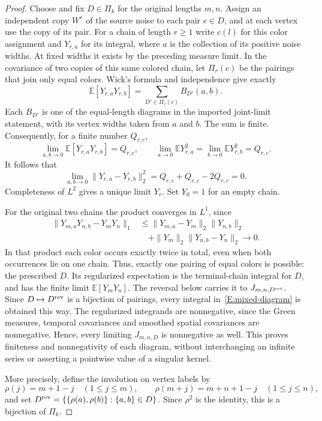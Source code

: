 \documentclass[12pt]{article}
\numberwithin{equation}{section}
\theoremstyle{definition}
\newcommand{\E}{\mathbb{E}}
\begin{document}
\begin{proof}
  Choose and fix $D\in\Pi_k$ for the original lengths $m,n$.
  Assign an independent copy $W^e$ of the source noise to each pair
  $e\in D$, and at each vertex use the copy of its pair. For a chain
  of length $r\ge1$ write $c(l)$ for this color assignment and
  $Y_{r,a}$ for its integral, where $a$ is the collection of its positive
  noise widths. At fixed widths it exists by the preceding measure limit.
  In the covariance of two copies of this same colored chain, let
  $\Pi_r(c)$ be the pairings that join only equal colors. Wick's formula
  and independence give exactly
  \[
    \E[Y_{r,a}Y_{r,b}]
    =\sum_{D'\in\Pi_r(c)}B_{D'}(a,b).
  \]
  Each $B_{D'}$ is one of the equal-length diagrams in the imported
  joint-limit statement, with its vertex widths taken from $a$ and $b$.
  The sum is finite. Consequently, for a finite number $Q_{r,c}$,
  \[
    \lim_{a,b\to0}\E[Y_{r,a}Y_{r,b}]=Q_{r,c},\qquad
    \lim_{a\to0}\E Y_{r,a}^2=\lim_{b\to0}\E Y_{r,b}^2=Q_{r,c}.
  \]
  It follows that
  \[
    \lim_{a,b\to0}\|Y_{r,a}-Y_{r,b}\|_2^2
    =Q_{r,c}+Q_{r,c}-2Q_{r,c}=0.
  \]
  Completeness of $L^2$ gives a unique limit $Y_r$. Set $Y_0=1$
  for an empty chain.

  For the original two chains the product converges in $L^1$, since
  \[
    \begin{split}
      \|Y_{m,a}Y_{n,b}-Y_mY_n\|_1
      &\le\|Y_{m,a}-Y_m\|_2\|Y_{n,b}\|_2\\
      &\quad+\|Y_m\|_2\|Y_{n,b}-Y_n\|_2\longrightarrow0.
    \end{split}
  \]
  In that product each color occurs exactly twice in total, even when
  both occurrences lie on one chain. Thus, exactly one pairing of equal
  colors is possible: the prescribed $D$. Its regularized expectation
  is the terminal-chain integral for $D$, and has the finite limit
  $\E[Y_mY_n]$. The reversal below carries it to $J_{m,n,D^{\rm rev}}$.
  Since $D\mapsto D^{\rm rev}$ is a bijection of pairings, every
  integral in~\eqref{E:mixed-diagram} is obtained this way.
  The regularized integrands are nonnegative, since the Green measures,
  temporal covariances and smoothed spatial covariances are nonnegative.
  Hence, every limiting $J_{m,n,D}$ is nonnegative as well. This proves
  finiteness and nonnegativity of each diagram, without interchanging
  an infinite series or asserting a pointwise value of a singular kernel.

  More precisely, define the involution on vertex labels by
  \[
    \rho(j)=m+1-j\quad(1\le j\le m),\qquad
    \rho(m+j)=m+n+1-j\quad(1\le j\le n),
  \]
  and set $D^{\rm rev}=\{\{\rho(a),\rho(b)\}:\{a,b\}\in D\}$.
  Since $\rho^2$ is the identity, this is a bijection of $\Pi_k$.


\end{proof}
\end{document}
